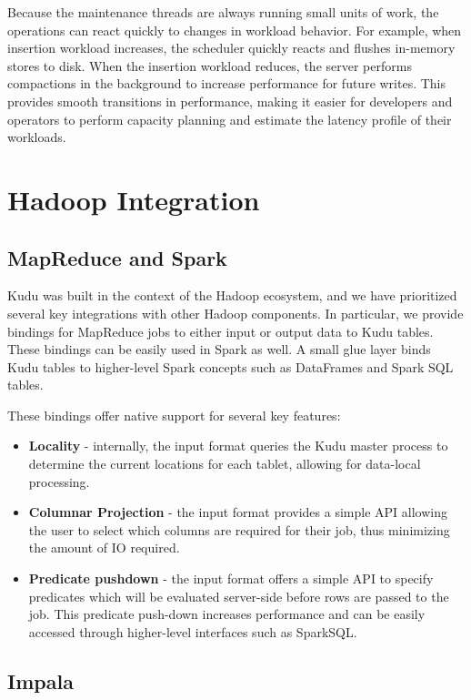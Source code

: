\documentclass[twocolumn,9pt]{article}
\begin{document}
Because the maintenance threads are always running small units of work, the operations
can react quickly to changes in workload behavior. For example, when insertion workload
increases, the scheduler quickly reacts and flushes in-memory stores to disk. When
the insertion workload reduces, the server performs compactions in the background
to increase performance for future writes. This provides smooth transitions in performance,
making it easier for developers and operators to perform capacity planning and
estimate the latency profile of their workloads.

\section{Hadoop Integration}
\label{sec:integration}

\subsection{MapReduce and Spark}

Kudu was built in the context of the Hadoop ecosystem, and we have prioritized several
key integrations with other Hadoop components. In particular, we provide bindings for
MapReduce jobs to either input or output data to Kudu tables. These bindings can be
easily used in Spark\cite{spark} as well. A small glue layer binds Kudu tables to higher-level
Spark concepts such as DataFrames and Spark SQL tables.

These bindings offer native support for several key features:
\begin{itemize}
\item {\bf Locality} - internally, the input format queries the Kudu master process to determine
the current locations for each tablet, allowing for data-local processing.
\item {\bf Columnar Projection} - the input format provides a simple API allowing the user to
select which columns are required for their job, thus minimizing the amount of IO required.
\item {\bf Predicate pushdown} - the input format offers a simple API to specify predicates
which will be evaluated server-side before rows are passed to the job. This predicate push-down
increases performance and can be easily accessed through higher-level interfaces such as
SparkSQL.
\end{itemize}

\subsection{Impala}
\end{document}
